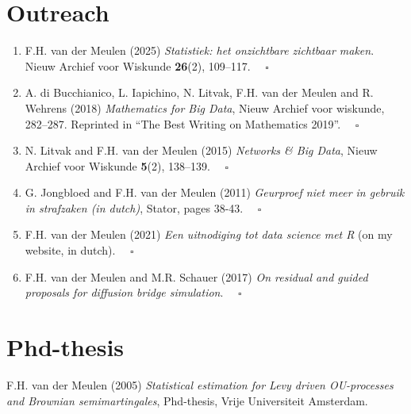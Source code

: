 \documentclass[
10pt, %
a4paper, %
oneside, %
headinclude,footinclude, %
BCOR5mm, %
]{scrartcl}
\begin{document}
\section{Outreach}


\begin{enumerate}
\item {\sc F.H. van der Meulen} (2025) {\it Statistiek: het onzichtbare zichtbaar maken}. Nieuw Archief voor Wiskunde {\bf 26}(2), 109--117. \hspace*{\fill}  $\quad \square$


\item {\sc A. di Bucchianico, L. Iapichino, N. Litvak, F.H. van der Meulen and R. Wehrens (2018)} {\it  Mathematics for Big Data}, Nieuw Archief voor wiskunde, 282--287. Reprinted in ``The Best Writing on Mathematics 2019''.\hspace*{\fill}  $\quad \square$



\item {\sc N. Litvak and F.H. van der Meulen (2015)} {\it  Networks \& Big Data}, Nieuw Archief voor Wiskunde {\bf 5}(2), 138--139.\hspace*{\fill}  $\quad \square$

\item {\sc G. Jongbloed and F.H. van der Meulen (2011)} {\it  Geurproef niet meer in gebruik in strafzaken (in dutch)}, Stator, pages 38-43.\hspace*{\fill}  $\quad \square$

\item {\sc F.H. van der Meulen (2021)} {\it  Een uitnodiging tot data science met R}  (on my website, in dutch).\hspace*{\fill}  $\quad \square$

\item {\sc F.H. van der Meulen and M.R. Schauer (2017)} {\it  On residual and guided proposals for diffusion bridge simulation}.  \hspace*{\fill} $\quad \square$
\end{enumerate}





\section{Phd-thesis}

 {\sc F.H. van der Meulen (2005)} {\it  Statistical estimation for Levy driven OU-processes and Brownian semimartingales}, Phd-thesis, Vrije Universiteit Amsterdam.



\end{document}
